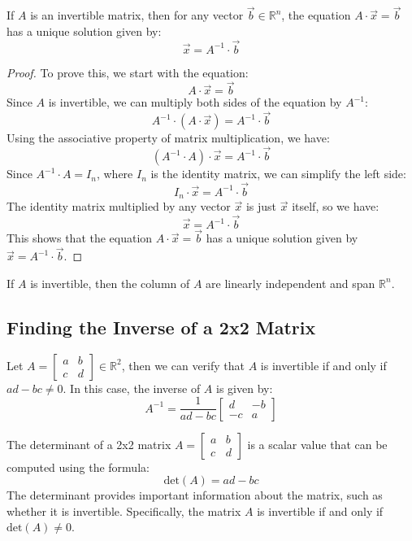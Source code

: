 \begin{theorem}
    If $A$ is an invertible matrix, then for any vector $\vec{b} \in \mathbb{R}^n$, the equation $A \cdot \vec{x} = \vec{b}$ has a unique solution given by:
    \[
        \vec{x} = A^{-1} \cdot \vec{b}
    \]
\end{theorem}
\begin{proof}
    To prove this, we start with the equation:
    \[
        A \cdot \vec{x} = \vec{b}
    \]
    Since $A$ is invertible, we can multiply both sides of the equation by $A^{-1}$:
    \[
        A^{-1} \cdot (A \cdot \vec{x}) = A^{-1} \cdot \vec{b}
    \]
    Using the associative property of matrix multiplication, we have:
    \[
        (A^{-1} \cdot A) \cdot \vec{x} = A^{-1} \cdot \vec{b}
    \]
    Since $A^{-1} \cdot A = I_n$, where $I_n$ is the identity matrix, we can simplify the left side:
    \[
        I_n \cdot \vec{x} = A^{-1} \cdot \vec{b}
    \]
    The identity matrix multiplied by any vector $\vec{x}$ is just $\vec{x}$ itself, so we have:
    \[
        \vec{x} = A^{-1} \cdot \vec{b}
    \]
    This shows that the equation $A \cdot \vec{x} = \vec{b}$ has a unique solution given by $\vec{x} = A^{-1} \cdot \vec{b}$.
\end{proof}
If $A$ is invertible, then the column of $A$ are linearly independent and span $\mathbb{R}^n$.

\subsection{Finding the Inverse of a 2x2 Matrix}
\begin{definition}
Let $A = \begin{bmatrix}
    a & b \\
    c & d
\end{bmatrix} \in \mathbb{R}^2$, then we can verify that $A$ is invertible if and only if $ad - bc \neq 0$. In this case, the inverse of $A$ is given by:
\[
    A^{-1} = \frac{1}{ad - bc} \begin{bmatrix}
        d & -b \\
        -c & a
    \end{bmatrix}
\]
\end{definition}

\begin{definition}
    The determinant of a 2x2 matrix \( A = \begin{bmatrix}
        a & b \\
        c & d
    \end{bmatrix} \) is a scalar value that can be computed using the formula:
    \[
        \text{det}(A) = ad - bc
    \]
    The determinant provides important information about the matrix, such as whether it is invertible. Specifically, the matrix \( A \) is invertible if and only if \( \text{det}(A) \neq 0 \).
\end{definition}

